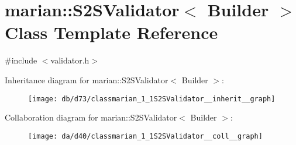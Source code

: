 \hypertarget{classmarian_1_1S2SValidator}{}\section{marian\+:\+:S2\+S\+Validator$<$ Builder $>$ Class Template Reference}
\label{classmarian_1_1S2SValidator}


{\ttfamily \#include $<$validator.\+h$>$}



Inheritance diagram for marian\+:\+:S2\+S\+Validator$<$ Builder $>$\+:
\nopagebreak
\begin{figure}[H]
\begin{center}
\leavevmode
\texttt{[image: db/d73/classmarian\_1\_1S2SValidator\_\_inherit\_\_graph]}
\end{center}
\end{figure}


Collaboration diagram for marian\+:\+:S2\+S\+Validator$<$ Builder $>$\+:
\nopagebreak
\begin{figure}[H]
\begin{center}
\leavevmode
\texttt{[image: da/d40/classmarian\_1\_1S2SValidator\_\_coll\_\_graph]}
\end{center}
\end{figure}
